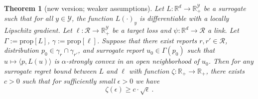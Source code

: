 \documentclass[12pt]{article}
\newcommand{\reals}{\mathbb{R}}
\newcommand{\prop}[1]{\mathrm{prop}[#1]}
\newcommand{\R}{\mathcal{R}}
\newcommand{\Y}{\mathcal{Y}}
\newcommand{\inprod}[2]{\langle #1, #2 \rangle}%
\newtheorem{theorem}{Theorem}
\begin{document}
\begin{theorem}[new version; weaker assumptions]
  Let $L:\reals^d \to \reals^\Y_+$ be a surrogate such that for all $y\in\Y$, the function $L(\cdot)_y$ is differentiable with a locally Lipschitz gradient.
  Let $\ell:\R \to \reals^\Y_+$ be a target loss and $\psi:\reals^d\to\R$ a link.
  Let $\Gamma := \prop{L}$, $\gamma := \prop{\ell}$.
  Suppose that there exist reports $r,r'\in\R$, distribution $p_0 \in \gamma_r \cap \gamma_{r'}$, and surrogate report $u_0 \in \Gamma(p_0)$ such that $u \mapsto \inprod{p}{L(u)}$ is $\alpha$-strongly convex in an open neighborhood of $u_0$.
  Then for any surrogate regret bound between $L$ and $\ell$ with function $\zeta:\reals_+\to\reals_+$, there exists $c > 0$ such that for sufficiently small $\epsilon>0$ we have
  \begin{equation}
    \label{eq:regret-lower-bound}
    \zeta(\epsilon) \geq c \cdot \sqrt{\epsilon}~.
  \end{equation}
\end{theorem}
\end{document}
